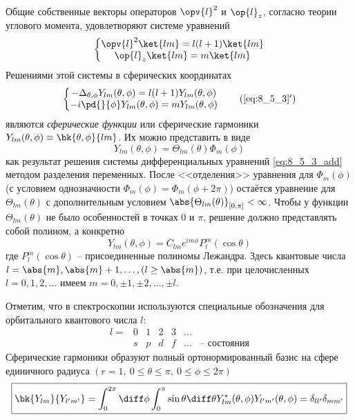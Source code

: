 Общие собственные векторы операторов $\opv{l}^2$ и $\op{l}_z$, согласно теории углового момента, удовлетворяют системе уравнений
\begin{equation}
\label{eq:8_5_3}
\left\{
  \begin{matrix}
    \opv{l}^2 \ket{lm} = l(l+1)\ket{lm} \\
    \op{l}_z \ket{lm} = m \ket{lm}
  \end{matrix}
\right.
\end{equation}%
%
Решениями этой системы в сферических координатах
\begin{equation}
\left\{
  \begin{matrix}
  \label{eq:8_5_3_add}
   - \Delta_{\theta, \phi} Y_{lm}(\theta, \phi) = l(l+1) Y_{lm}(\theta, \phi) 
    \\
     -i\pd{}{\phi} Y_{lm}(\theta, \phi) = m Y_{lm}(\theta, \phi) 
  \end{matrix}
\right .
\tag{\ref{eq:8_5_3}$'$}
\end{equation}%
%
являются {\em сферические функции} или {сферические гармоники} $Y_{lm}(\theta, \phi) \equiv \bk{\theta, \phi}{lm}$. Их можно представить в виде
$$
Y_{lm}(\theta, \phi) = \Theta_{lm}(\theta) \Phi_m(\phi)
$$%
%
как результат решения системы дифференциальных уравнений \eqref{eq:8_5_3_add} методом разделения переменных. После <<отделения>> уравнения для $\Phi_m(\phi)$ (с условием однозначности $\Phi_m(\phi) = \Phi_m(\phi + 2\pi)$) остаётся уравнение для $\Theta_{lm}(\theta)$ с дополнительным условием $\abs{\Theta_{lm}(\theta)}_{[0,\pi]} < \infty$. Чтобы у функции $\Theta_{lm}(\theta)$ не было особенностей в точках $0$ и $\pi$, решение должно представлять собой полином, а конкретно
$$
\boxed{
  Y_{lm}(\theta, \phi) = C_{lm} e^{im\phi} P^m_l(\cos \theta)
}
$$%
%
где  $P^m_l(\cos \theta)$ -- присоединенные полиномы Лежандра\footnotemark. Здесь квантовые числа $l = \abs{m}, \abs{m} + 1, \dots, (l \ge \abs{m})$, т.е. при целочисленных $l = 0, 1, 2, ...$ имеем $m = 0, \pm 1, \pm 2, ..., \pm l$.

Отметим, что в спектроскопии используются специальные обозначения для орбитального квантового числа $l$:
$$
\begin{matrix}
l =  & 0 & 1 & 2 & 3 & ... & \\
       & s & p & d & f & ... & \text{-- состояния}
\end{matrix}
$$%
%
Сферические гармоники образуют полный ортонормированный базис на сфере единичного радиуса $(r = 1,~0 \leqslant \theta \leqslant \pi,~0 \leqslant \phi \leqslant 2\pi)$
\begin{equation}
\label{eq:8_5_4}
\boxed{\bk{Y_{lm}}{Y_{l'm'}} = \int_0^{2\pi} \diff\phi \int_0^\pi \sin \theta \diff\theta Y^*_{lm}(\theta, \phi) Y_{l'm'}(\theta, \phi) = \delta_{ll'} \delta_{mm'}}
\end{equation}
